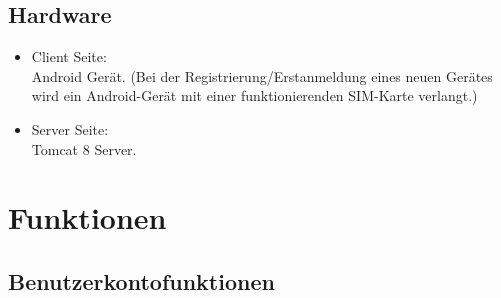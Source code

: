 \documentclass[parskip=full]{scrartcl}
\begin{document}
\subsection{Hardware}
\begin{itemize}
\item Client Seite: \\ Android Gerät. (Bei der Registrierung/Erstanmeldung eines neuen Gerätes wird ein Android-Gerät mit einer funktionierenden SIM-Karte verlangt.)\\
\item Server Seite: \\ Tomcat 8 Server.
\end{itemize}

\newpage
\section{Funktionen}

\subsection{Benutzerkontofunktionen}
\end{document}
